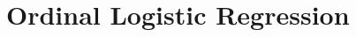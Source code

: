 \documentclass{beamer}
\begin{document}
\section{Ordinal Logistic Regression}










\end{document}
